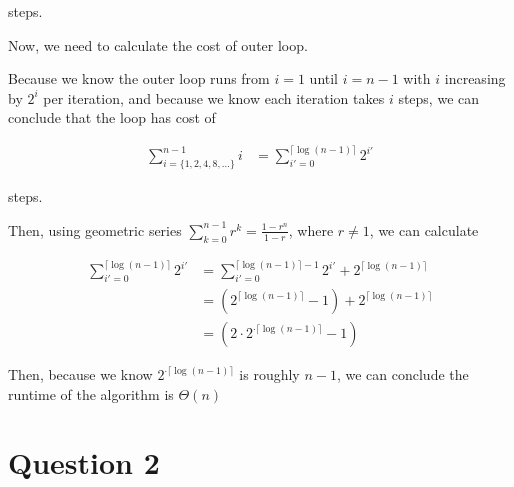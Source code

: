 \documentclass[12pt]{article}
\begin{document}
\begin{enumerate}[a.]
    steps.

    \bigskip

    Now, we need to calculate the cost of outer loop.

    \bigskip

    Because we know the outer loop runs from $i = 1$ until $i = n-1$ with $i$ increasing
    by $2^i$ per iteration, and because we know each iteration takes $i$ steps, we can
    conclude that the loop has cost of

    \begin{align}
        \sum\limits_{i= \{1,2,4,8,\dots\}}^{n-1} i &= \sum\limits_{i'=0}^{\lceil \log (n-1) \rceil} 2^{i'}
    \end{align}

    steps.

    \bigskip

    Then, using geometric series $\sum\limits_{k=0}^{n-1} r^k = \frac{1-r^n}{1-r}$, where $r \neq 1$, we can calculate

    \begin{align}
        \sum\limits_{i'=0}^{\lceil \log (n-1) \rceil} 2^{i'} &= \sum\limits_{i'=0}^{\lceil \log (n-1) \rceil - 1} 2^{i'} + 2^{\lceil \log (n-1) \rceil}\\
        &= (2^{\lceil \log(n-1) \rceil} - 1) + 2^{\lceil \log(n-1) \rceil}\\
        &= (2 \cdot 2^{\cdot \lceil \log(n-1) \rceil} - 1)
    \end{align}

    \bigskip

    Then, because we know $2^{\cdot \lceil \log(n-1) \rceil}$ is roughly $n-1$,
    we can conclude the runtime of the algorithm is $\Theta(n)$


\end{enumerate}

\section*{Question 2}
\end{document}
